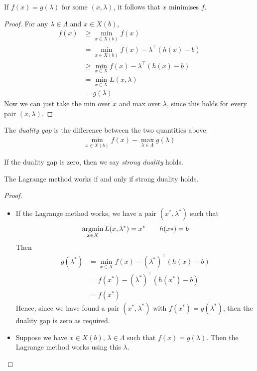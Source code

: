 \documentclass{../../template/note}
\begin{document}
    \begin{remark*}
        If $f(x) = g(\lambda)$ for some $(x, \lambda)$, it follows that $x$ minimises $f$.
    \end{remark*}
    
    \begin{proof}
        For any $\lambda \in \Lambda$ and $x \in X(b)$,
        \begin{align*}
            f(x) &\geq \min_{x \in X(b)} f(x) \\
            &= \min_{x \in X(b)} f(x) - \lambda^\intercal (h(x)-b) \\
            &\geq \min_{x \in X} f(x) - \lambda^\intercal (h(x)-b) \\
            &= \min_{x \in X} L(x, \lambda) \\
            &= g(\lambda)
        \end{align*}
        Now we can just take the min over $x$ and max over $\lambda$, since this holds for every pair $(x, \lambda)$.
    \end{proof}
    
    \begin{definition}
        The \emph{duality gap} is the difference between the two quantities above:
        \begin{align*}
            \min_{x \in X(b)} f(x) - \max_{\lambda \in \Lambda} g(\lambda)
        \end{align*}       
    \end{definition}
    
    If the duality gap is zero, then we say \emph{strong duality} holds.

    \begin{theorem}
        The Lagrange method works if and only if strong duality holds.
    \end{theorem}
    
    \begin{proof}
        \begin{itemize}
            \item[$\implies$] If the Lagrange method works, we have a pair $(x^*, \lambda^*)$ such that
            \begin{align*}
                \operatorname*{arg min}_{x \in X} L(x, \lambda^*) = x^* \qquad h(x*) = b
            \end{align*}
            Then
            \begin{align*}
                g(\lambda^*) &= \min_{x \in X} f(x) - (\lambda^*)^\intercal (h(x)-b) \\
                &= f(x^*) - (\lambda^*)^\intercal (h(x^*)-b) \\
                &= f(x^*)
            \end{align*}
            Hence, since we have found a pair $(x^*, \lambda^*)$ with $f(x^*) = g(\lambda^*)$, then the duality gap is zero as required.
            \item[$\impliedby$] Suppose we have $x \in X(b)$, $\lambda \in \Lambda$ such that $f(x) = g(\lambda)$. Then the Lagrange method works using this $\lambda$.            
        \end{itemize}
    \end{proof}
    
\end{document}
